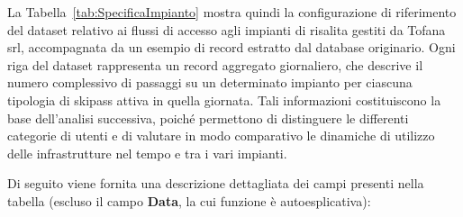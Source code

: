 La Tabella~\ref{tab:SpecificaImpianto} mostra quindi la configurazione di riferimento del dataset relativo ai flussi di accesso agli impianti di risalita gestiti da Tofana srl, accompagnata da un esempio di record estratto dal database originario.
Ogni riga del dataset rappresenta un record aggregato giornaliero, che descrive il numero complessivo di passaggi su un determinato impianto per ciascuna tipologia di skipass attiva in quella giornata.
Tali informazioni costituiscono la base dell’analisi successiva, poiché permettono di distinguere le differenti categorie di utenti e di valutare in modo comparativo le dinamiche di utilizzo delle infrastrutture nel tempo e tra i vari impianti.

Di seguito viene fornita una descrizione dettagliata dei campi presenti nella tabella (escluso il campo \textbf{Data}, la cui funzione è autoesplicativa):
